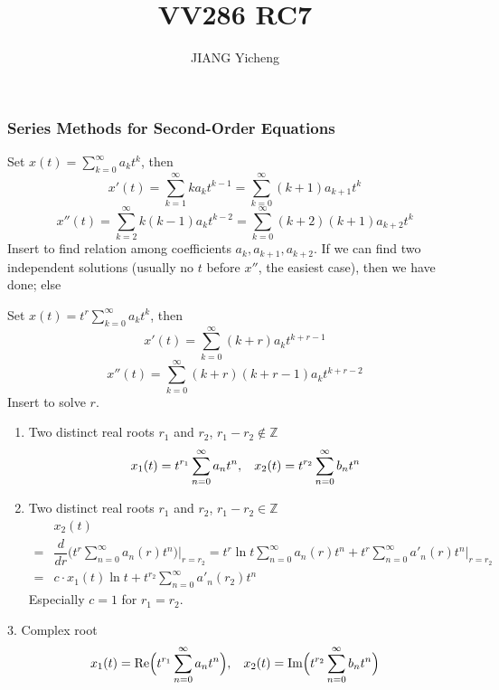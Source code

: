 \documentclass{beamer}
\title{\textcolor[rgb]{0,0.168,0.376}{VV286 RC7}}
\author{JIANG Yicheng}
\begin{document}
\begin{frame}
\titlepage
\end{frame}





\begin{frame}
\frametitle{Series Methods for Second-Order Equations}
Set $x(t)=\sum\limits_{k=0}^{\infty}a_kt^k$, then
$$x'(t)=\sum\limits_{k=1}^{\infty}ka_kt^{k-1}=\sum\limits_{k=0}^{\infty}(k+1)a_{k+1}t^{k}$$
$$x''(t)=\sum\limits_{k=2}^{\infty}k(k-1)a_kt^{k-2}=\sum\limits_{k=0}^{\infty}(k+2)(k+1)a_{k+2}t^{k}$$
Insert to find relation among coefficients $a_k,a_{k+1},a_{k+2}$. If we can find two independent solutions (usually no $t$ before $x''$, the easiest case), then we have done; else

\end{frame}
\begin{frame}
Set $x(t)=t^r\sum\limits_{k=0}^{\infty}a_kt^k$, then
$$x'(t)=\sum\limits_{k=0}^{\infty}(k+r)a_kt^{k+r-1}$$
$$x''(t)=\sum\limits_{k=0}^{\infty}(k+r)(k+r-1)a_kt^{k+r-2}$$
Insert to solve $r$.
\end{frame}
\begin{frame}
\begin{enumerate}
\item Two distinct real roots $r_1$ and $r_2$, $r_1-r_2\notin\mathbb{Z}$
$$x_1(t)=t^{r_1}\sum\limits_{n=0}^{\infty}a_nt^n,\hspace{3mm}x_2(t)=t^{r_2}\sum\limits_{n=0}^{\infty}b_nt^n$$
\item Two distinct real roots $r_1$ and $r_2$, $r_1-r_2\in\mathbb{Z}$
\begin{align*}
&x_2(t)\\
=&\dfrac{d}{d r}\Big(t^r\sum\limits_{n=0}^{\infty}a_n(r)t^n\Big)\Bigg|_{r=r_2}=t^{r}\ln t\sum\limits_{n=0}^{\infty}a_n(r)t^n+t^{r}\sum\limits_{n=0}^{\infty}a'_n(r)t^n\Bigg|_{r=r_2}\\
=&c\cdot x_1(t)\ln t+t^{r_2}\sum\limits_{n=0}^{\infty}a'_n(r_2)t^n
\end{align*}
Especially $c=1$ for $r_1=r_2$.
\end{enumerate}
\end{frame}
\begin{frame}
\begin{block}{3. Complex root}
$$x_1(t)=\text{Re}\Big(t^{r_1}\sum\limits_{n=0}^{\infty}a_nt^n\Big),\hspace{3mm}x_2(t)=\text{Im}\Big(t^{r_2}\sum\limits_{n=0}^{\infty}b_nt^n\Big)$$

\end{block}
\end{frame}
\end{document}
